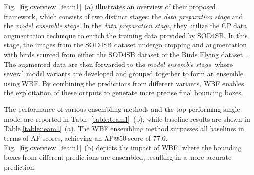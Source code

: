 \documentclass{mva_style}
\begin{document}
Fig.~\ref{fig:overview_team1}~(a) illustrates an overview of their proposed framework, which consists of two distinct stages: the \textit{data preparation stage} and the \textit{model ensemble stage}. In the \textit{data preparation stage}, they utilize the CP data augmentation technique to enrich the training data provided by SOD4SB. In this stage, the images from the SOD4SB dataset undergo cropping and augmentation with birds sourced from either the SOD4SB dataset or the Birds Flying dataset~\cite{birdsflyingdataset}. The augmented data are then forwarded to the \textit{model ensemble stage}, where several model variants are developed and grouped together to form an ensemble using WBF. By combining the predictions from different variants,  WBF enables the exploitation of these outputs to generate more precise final bounding boxes.

The performance of various ensembling methods and the top-performing single model 
are reported in Table~\ref{table:team1}~(b), while baseline results are shown in Table \ref{table:team1}~(a). The WBF ensembling method surpasses all baselines in terms of AP scores, achieving an AP@50 score of 77.6. Fig.~\ref{fig:overview_team1}~(b) depicts the impact of WBF, where the bounding boxes from different predictions are ensembled, resulting in a more accurate prediction.
\end{document}
